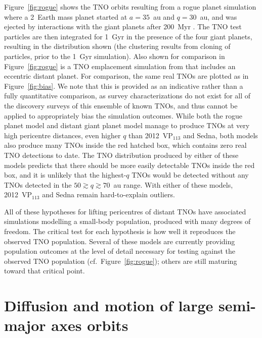 \documentclass[preprint]{aastex62}
\begin{document}
Figure~\ref{fig:rogue} shows the TNO orbits resulting from a rogue planet simulation where a 2~Earth mass planet started at $a=35$~au and $q=30$~au, and was ejected by interactions with the giant planets after 200~Myr \citep[from][]{gladmanchan06}.  
The TNO test particles are then integrated for 1~Gyr in the presence of the four giant planets, resulting in the distribution shown (the clustering results from cloning of particles, prior to the 1~Gyr simulation).
Also shown for comparison in Figure~\ref{fig:rogue} is a TNO emplacement simulation from \citet{lawler2017} that includes an eccentric distant planet.
For comparison, the same real TNOs are plotted as in Figure~\ref{fig:bias}.
We note that this is provided as an indicative rather than a fully quantitative comparison, as survey characterizations do not exist for all of the discovery surveys of this ensemble of known TNOs, and thus cannot be applied to appropriately bias the simulation outcomes.
While both the rogue planet model and distant giant planet model manage to produce TNOs at very high pericentre distances, even higher $q$ than 2012~VP$_{113}$ and Sedna, both models also produce many TNOs inside the red hatched box, which contains zero real TNO detections to date.
The TNO distribution produced by either of these models predicts that there should be more easily detectable TNOs inside the red box, and it is unlikely that the highest-$q$ TNOs would be detected without any TNOs detected in the $50 \gtrsim q \gtrsim 70$~au range.
With either of these models, 2012~VP$_{113}$ and Sedna remain hard-to-explain outliers.

All of these hypotheses for lifting pericentres of distant TNOs have associated simulations modelling a small-body population, produced with many degrees of freedom. 
The critical test for each hypothesis is how well it reproduces the observed TNO population. 
Several of these models are currently providing population outcomes at the level of detail necessary for testing against the observed TNO population (cf.\ Figure~\ref{fig:rogue}); others are still maturing toward that critical point.

\section{Diffusion and motion of large semi-major axes orbits} \label{sec:diffusion}
\end{document}
